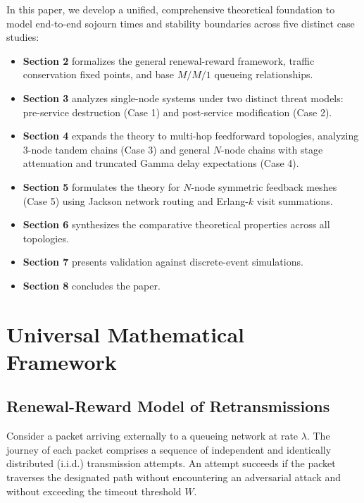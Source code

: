 \documentclass[journal,compsoc]{IEEEtran}
\begin{document}
In this paper, we develop a unified, comprehensive theoretical foundation to model end-to-end sojourn times and stability boundaries across five distinct case studies:
\begin{itemize}
    \item \textbf{Section 2} formalizes the general renewal-reward framework, traffic conservation fixed points, and base $M/M/1$ queueing relationships.
    \item \textbf{Section 3} analyzes single-node systems under two distinct threat models: pre-service destruction (Case 1) and post-service modification (Case 2).
    \item \textbf{Section 4} expands the theory to multi-hop feedforward topologies, analyzing 3-node tandem chains (Case 3) and general $N$-node chains with stage attenuation and truncated Gamma delay expectations (Case 4).
    \item \textbf{Section 5} formulates the theory for $N$-node symmetric feedback meshes (Case 5) using Jackson network routing and Erlang-$k$ visit summations.
    \item \textbf{Section 6} synthesizes the comparative theoretical properties across all topologies.
    \item \textbf{Section 7} presents validation against discrete-event simulations.
    \item \textbf{Section 8} concludes the paper.
\end{itemize}

\section{Universal Mathematical Framework}
\subsection{Renewal-Reward Model of Retransmissions}
Consider a packet arriving externally to a queueing network at rate $\lambda$. The journey of each packet comprises a sequence of independent and identically distributed (i.i.d.) transmission attempts. An attempt succeeds if the packet traverses the designated path without encountering an adversarial attack and without exceeding the timeout threshold $W$.
\end{document}
